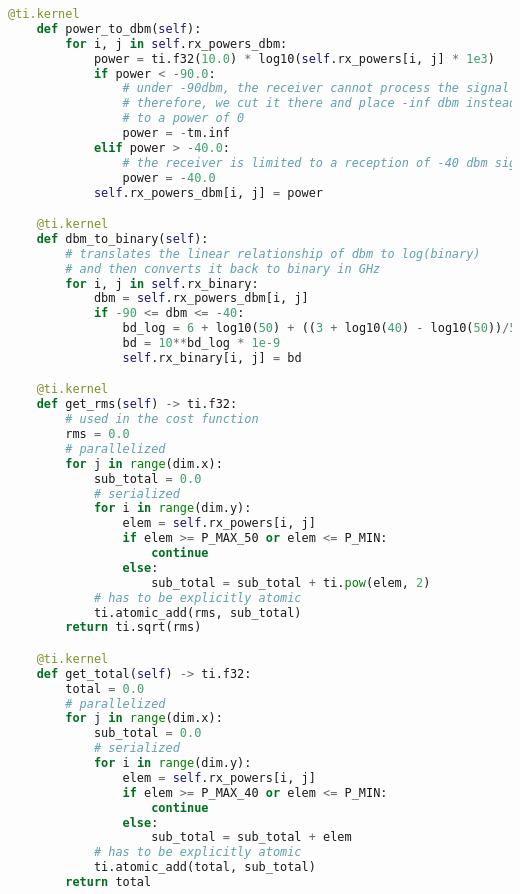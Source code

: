\begin{lstlisting}[language=python]
    @ti.kernel
    def power_to_dbm(self):
        for i, j in self.rx_powers_dbm:
            power = ti.f32(10.0) * log10(self.rx_powers[i, j] * 1e3)
            if power < -90.0:
                # under -90dbm, the receiver cannot process the signal
                # therefore, we cut it there and place -inf dbm instead, equivalent
                # to a power of 0
                power = -tm.inf
            elif power > -40.0:
                # the receiver is limited to a reception of -40 dbm signal
                power = -40.0
            self.rx_powers_dbm[i, j] = power

    @ti.kernel
    def dbm_to_binary(self):
        # translates the linear relationship of dbm to log(binary)
        # and then converts it back to binary in GHz
        for i, j in self.rx_binary:
            dbm = self.rx_powers_dbm[i, j]
            if -90 <= dbm <= -40:
                bd_log = 6 + log10(50) + ((3 + log10(40) - log10(50))/50 * (dbm + 90))
                bd = 10**bd_log * 1e-9
                self.rx_binary[i, j] = bd

    @ti.kernel
    def get_rms(self) -> ti.f32:
        # used in the cost function
        rms = 0.0
        # parallelized
        for j in range(dim.x):
            sub_total = 0.0
            # serialized
            for i in range(dim.y):
                elem = self.rx_powers[i, j]
                if elem >= P_MAX_50 or elem <= P_MIN:
                    continue
                else:
                    sub_total = sub_total + ti.pow(elem, 2)
            # has to be explicitly atomic
            ti.atomic_add(rms, sub_total)
        return ti.sqrt(rms)

    @ti.kernel
    def get_total(self) -> ti.f32:
        total = 0.0
        # parallelized
        for j in range(dim.x):
            sub_total = 0.0
            # serialized
            for i in range(dim.y):
                elem = self.rx_powers[i, j]
                if elem >= P_MAX_40 or elem <= P_MIN:
                    continue
                else:
                    sub_total = sub_total + elem
            # has to be explicitly atomic
            ti.atomic_add(total, sub_total)
        return total

\end{lstlisting}